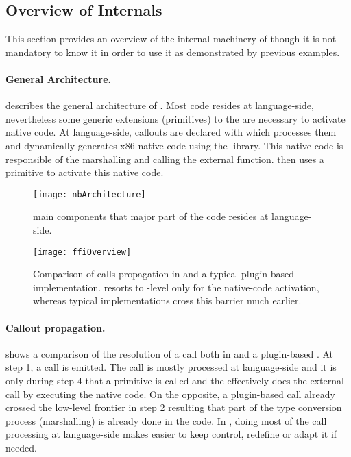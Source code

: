 \subsection{Overview of \NBFFI Internals}

This section provides an overview of the internal machinery of \NBFFI though it is not mandatory to know it in order to use it as demonstrated by previous examples.

\paragraph{General Architecture.}
 describes the general architecture of \NB.
Most code resides at language-side, nevertheless some generic extensions (primitives) to the \VM are necessary to activate native code.
At language-side, callouts are declared with \NBFFI which processes them and dynamically generates x86 native code using the  library.
This native code is responsible of the marshalling and calling the external function.
\NB then uses a primitive to activate this native code.

\begin{figure}[h]
	\centering
	\texttt{[image: nbArchitecture]}
	\caption[\NB Components Layering]{\NB main components that major part of the code resides at language-side.}
\end{figure}

\begin{figure*}[t]
	\centering
	\texttt{[image: ffiOverview]}
	\caption[\FFI Implementation Comparison]{Comparison of \FFI calls propagation in \NBFFI and a typical \VM plugin-based implementation. \NB resorts to \VM-level only for the native-code activation, whereas typical implementations cross this barrier much earlier.}
\end{figure*}

\paragraph{Callout propagation.}
 shows a comparison of the resolution of a \FFI call both in \NBFFI and a plugin-based \FFI.
At step 1, a \FFI call is emitted.
The \NBFFI call is mostly processed at language-side and it is only during step 4 that a primitive is called and the \VM effectively does the external call by executing the native code.
On the opposite, a plugin-based \FFI call already crossed the low-level frontier in step 2 resulting that part of the type conversion process (marshalling) is already done in the \VM code.
In \NBFFI, doing most of the \FFI call processing at language-side makes easier to keep control, redefine or adapt it if needed.

